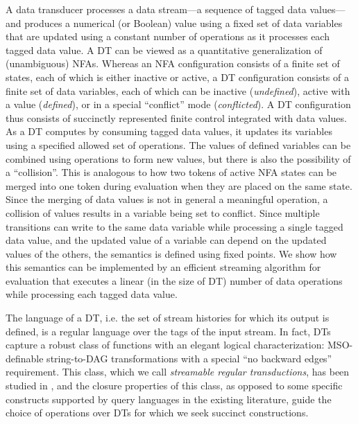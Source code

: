 A data transducer processes a data stream---a sequence of tagged data values---and produces
a numerical (or Boolean) value using a fixed set of data variables that are updated
using a constant number of operations as it processes each tagged data value.
A DT can be viewed as a quantitative generalization of (unambiguous) NFAs.
Whereas an NFA configuration consists of a finite set of states, each of which is either inactive or active, %
a DT configuration consists of a finite set of data variables, each of which can be inactive (\emph{undefined}), active
with a value (\emph{defined}), or in a special ``conflict'' mode (\emph{conflicted}).
A DT configuration thus consists of succinctly represented finite control integrated with data values.
As a DT computes by consuming tagged data values, it updates its variables using a specified allowed
set of operations. The values of defined variables can be combined using operations to form new values,
but there is also the possibility of a ``collision''.
This is analogous to how two tokens of active NFA states can be merged into one token
during evaluation when they are placed on the same state. Since the merging of data values
is not in general a meaningful operation, a collision of values results in a variable being set
to conflict.
Since multiple transitions can write to the same data variable while processing a single tagged data value,
and the updated value of a variable can depend on the updated values of the others,
the semantics is defined using fixed points.
We show how this semantics can be implemented
by an efficient streaming algorithm for evaluation that executes a linear (in the size of DT) number
of data operations while processing each tagged data value.

The language of a DT, i.e. the set of stream histories for which its output is defined,
is a regular language over the tags of the input stream.
In fact, DTs capture a robust class of functions with an elegant logical
characterization: MSO-definable string-to-DAG %
transformations with a special ``no backward edges'' requirement. %
This class, which we call \emph{streamable regular transductions}, has been studied in
\cite{EM1999MTT,C1994MSOGT,arXiv2018}, and the closure properties of this class, as opposed to some specific constructs supported by
query languages in the existing literature, guide the choice of operations over
DTs for which we seek succinct constructions. %


